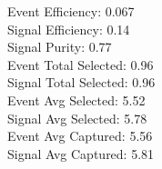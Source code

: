 Event  Efficiency:     0.067\\
Signal Efficiency:     0.14\\
Signal Purity:         0.77\\
Event  Total Selected: 0.96\\
Signal Total Selected: 0.96\\
Event  Avg Selected:   5.52\\
Signal Avg Selected:   5.78\\
Event  Avg Captured:   5.56\\
Signal Avg Captured:   5.81